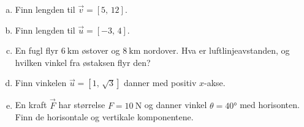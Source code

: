 %
\begin{enumerate}[a)]
    \item Finn lengden til $\vec{v} = [5,\,12]$.
    \item Finn lengden til $\vec{u} = [-3,\,4]$.
    \item En fugl flyr $\SI{6}{\kilo\metre}$ østover og $\SI{8}{\kilo\metre}$ nordover. Hva er luftlinjeavstanden, og hvilken vinkel fra østaksen flyr den?
    \item Finn vinkelen $\vec{u} = [1,\,\sqrt{3}]$ danner med positiv $x$-akse.
    \item En kraft $\vec{F}$ har størrelse $F = \SI{10}{\newton}$ og danner vinkel $\theta = 40°$ med horisonten. Finn de horisontale og vertikale komponentene.
\end{enumerate}
